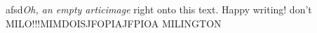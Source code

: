 afsd\textit{Oh, an empty articimage} right onto this text. Happy writing! 
don't MILO!!!MIMDOISJFOPIAJFPIOA MILINGTON
